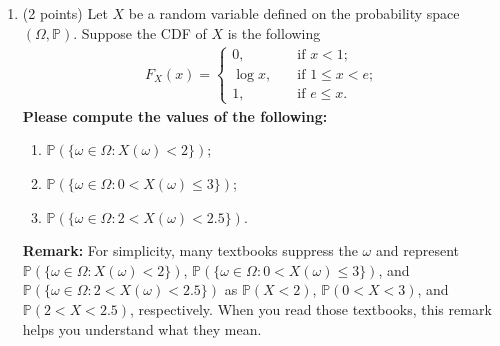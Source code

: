 \documentclass[11pt]{article}
\newcommand{\p}{\mathbb{P}}
\begin{document}
\begin{enumerate}
\begin{proof}
    We have that \(\p(X=0)=1=\p(\Omega)\implies \{\omega\in\Omega\ |\ X(\omega)=0\}=\Omega\). Thus,
    \begin{itemize}
        \item When \(x<0\), we have that \(F_X(x)=\p(X\leq x)=\p(\emptyset)=0\).
        \item When \(x\geq 0\), we have that \(F_X(x)=\p(X\leq x)=\p(\Omega)=1\).
    \end{itemize}
    Therefore, \(F_X(x)=
    \begin{cases}
        0 & \text{if } x<0,\\
        1 & \text{if } x\geq 1.
    \end{cases}\)
\end{proof}

\item (2 points) Let $X$ be a random variable defined on the probability space $(\Omega,\mathbb{P})$. Suppose the CDF of $X$ is the following
\begin{align*}
    F_X(x)=\left\{
    \begin{aligned}
    0,\ \ \ &\text{ if }x<1;\\
    \log x,\ \ \ &\text{ if }1\le x<e;\\
    1,\ \ \ &\text{ if }e\le x.
    \end{aligned}
    \right.
\end{align*}
\textbf{Please compute the values of the following:}
\begin{enumerate}
    \item $\mathbb{P}(\{\omega\in\Omega: X(\omega)<2\})$;
    \item $\mathbb{P}(\{\omega\in\Omega: 0<X(\omega)\le3\})$;
    \item $\mathbb{P}(\{\omega\in\Omega: 2<X(\omega)<2.5\})$.
\end{enumerate}
\textbf{Remark:} For simplicity, many textbooks suppress the $\omega$ and represent  $\mathbb{P}(\{\omega\in\Omega: X(\omega)<2\})$, $\mathbb{P}(\{\omega\in\Omega: 0<X(\omega)\le3\})$, and $\mathbb{P}(\{\omega\in\Omega: 2<X(\omega)<2.5\})$ as $\mathbb{P}(X<2)$, $\mathbb{P}(0<X<3)$, and $\mathbb{P}(2<X<2.5)$, respectively. When you read those textbooks, this remark helps you understand what they mean.

\end{enumerate}


\newpage
\end{document}
